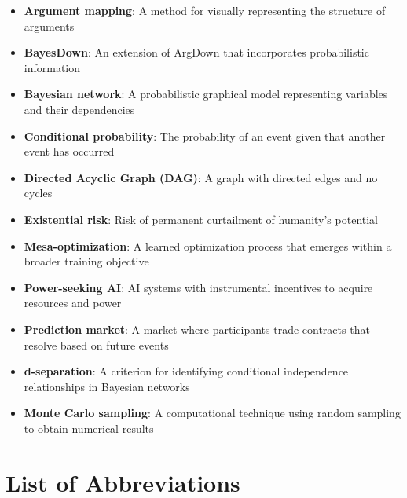 \documentclass[
  11pt,
  letterpaper,
  openany]{book}
\providecommand{\tightlist}{%
  \setlength{\itemsep}{0pt}\setlength{\parskip}{0pt}}
\begin{document}
\begin{itemize}
\tightlist
\item
  \textbf{Argument mapping}: A method for visually representing the
  structure of arguments\\
\item
  \textbf{BayesDown}: An extension of ArgDown that incorporates
  probabilistic information\\
\item
  \textbf{Bayesian network}: A probabilistic graphical model
  representing variables and their dependencies\\
\item
  \textbf{Conditional probability}: The probability of an event given
  that another event has occurred\\
\item
  \textbf{Directed Acyclic Graph (DAG)}: A graph with directed edges and
  no cycles\\
\item
  \textbf{Existential risk}: Risk of permanent curtailment of humanity's
  potential\\
\item
  \textbf{Mesa-optimization}: A learned optimization process that
  emerges within a broader training objective\\
\item
  \textbf{Power-seeking AI}: AI systems with instrumental incentives to
  acquire resources and power\\
\item
  \textbf{Prediction market}: A market where participants trade
  contracts that resolve based on future events\\
\item
  \textbf{d-separation}: A criterion for identifying conditional
  independence relationships in Bayesian networks\\
\item
  \textbf{Monte Carlo sampling}: A computational technique using random
  sampling to obtain numerical results
\end{itemize}

\section*{List of Abbreviations}\label{sec-abbr}

\end{document}

